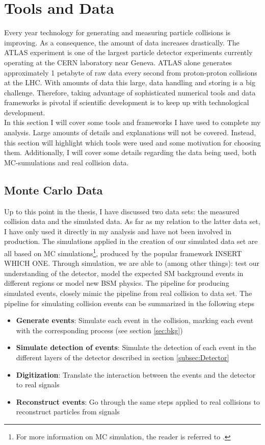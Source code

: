 \section{Tools and Data}
Every year technology for generating and measuring particle collisions is improving. 
As a consequence, the amount of data increases drastically. The ATLAS experiment
is one of the largest particle detector experiments currently operating at the 
CERN laboratory near Geneva. ATLAS alone generates approximately 1 petabyte of raw
data every second from proton-proton collisions at the \ac{LHC}. 
With amounts of data this large, data handling and storing is a big challenge. 
Therefore, taking advantage of sophisticated numerical tools and data frameworks is
pivotal if scientific development is to keep up with technological development.
\\
In this section I will cover some tools and frameworks I have used to 
complete my analysis. Large amounts of details and explanations will not be covered. 
Instead, this section will highlight which tools were used and some motivation
for choosing them. Additionally, I will cover some details regarding the data
being used, both \ac{MC}-sumulations and real collision data.
\subsection{Monte Carlo Data}
Up to this point in the thesis, I have discussed two data sets: the measured collision data and the simulated data. 
As far as my relation to the latter data set, I have only used it directly in my analysis and have not been involved in 
production. The simulations applied in the creation of our simulated data set are all based on \acf{MC} simulations\footnote{For 
more information on \ac{MC} simulation, the reader is referred to \cite{raychaudhuri_introduction_2008}.}, produced 
by the popular framework INSERT WHICH ONE. Through simulation, we 
are able to (among other things): test our understanding of the detector, model the expected \ac{SM} background events in different 
regions or model new \ac{BSM} physics. The pipeline for producing simulated events, closely mimic the pipeline from real collision 
to data set. The pipeline for simulating collision events can be summarized in the following steps
\begin{itemize}
  \item \textbf{Generate events}: Simulate each event in the collision, marking each event with the corresponding process (see section \ref{sec:bkg})
  \item \textbf{Simulate detection of events}: Simulate the detection of each event in the different layers of the detector described in section \ref{subsec:Detector}
  \item \textbf{Digitization}: Translate the interaction between the events and the detector to real signals
  \item \textbf{Reconstruct events}: Go through the same steps applied to real collisions to reconstruct particles from signals
\end{itemize}
